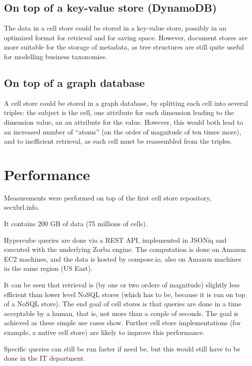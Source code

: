 \documentclass{acm_proc_article-sp}
\begin{document}
\subsection{On top of a key-value store (DynamoDB)}

The data in a cell store could be stored in a key-value store, possibly in an optimized format for retrieval and for saving space. However, document stores are more suitable for the storage of metadata, as tree structures are still quite useful for modelling business taxonomies.

\subsection{On top of a graph database}

A cell store could be stored in a graph database, by splitting each cell into several triples: the subject is the cell, one attribute for each dimension leading to the dimension value, an an attribute for the value. However, this would both lead to an increased number of ``atoms'' (on the order of magnitude of ten times more), and to inefficient retrieval, as each cell must be reassembled from the triples.

\section{Performance}
\label{section-performance}
Measurements were performed on top of the first cell store repository, secxbrl.info.

It contains 200 GB of data (75 millions of cells).

Hypercube queries are done via a REST API, implemented in JSONiq and executed with the underlying Zorba engine. The computation is done on Amazon EC2 machines, and the data is hosted by compose.io, also on Amazon machines in the same region (US East).

It can be seen that retrieval is (by one or two orders of magnitude) slightly less efficient than lower level NoSQL stores (which has to be, because it is run on top of a NoSQL store). The end goal of cell stores is that queries are done in a time acceptable by a human, that is, not more than a couple of seconds. The goal is achieved as these simple use cases show. Further cell store implementations (for example, a native cell store) are likely to improve this performance.

Specific queries can still be run faster if need be, but this would still have to be done in the IT department.
\end{document}
